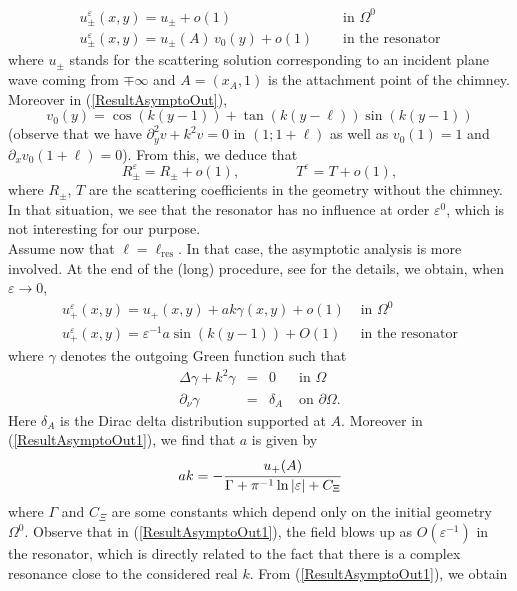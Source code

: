 \documentclass[11pt,a4paper]{report}
\newcommand{\eps}{\varepsilon}
\newcommand{\Om}{\Omega}
\newcommand{\mrm}[1]{\mathrm{#1}}
\begin{document}
\begin{equation}\label{ResultAsymptoOut}
\begin{array}{|ll}
u^\eps_{\pm}(x,y)=u_{\pm}+o(1) &\quad\mbox{ in }\Om^0\\[4pt]
u^{\eps}_{\pm}(x,y)=u_{\pm}(A)\,v_0(y)+o(1) &\quad\mbox{ in the resonator}
\end{array}
\end{equation}
where $u_{\pm}$ stands for the scattering solution corresponding to an incident plane wave coming from $\mp\infty$ and $A=(x_A,1)$ is the attachment point of the chimney. Moreover in (\ref{ResultAsymptoOut}),
\[
v_0(y)=\cos(k(y-1)) + \tan(k(y-\ell))\sin(k(y-1))
\]
(observe that we have $\partial^2_yv+k^2v=0$ in $(1;1+\ell)$ as well as $v_0(1)=1$ and $\partial_xv_0(1+\ell)=0$). From this, we deduce that 
\[
R^\eps_{\pm}=R_{\pm}+o(1),\qquad\qquad T^\eps= T+o(1),
\]
where $R_{\pm}$, $T$ are the scattering coefficients in the geometry without the chimney. In that situation, we see that the resonator has no influence at order $\eps^0$, which is not interesting for our purpose.\\
\newline 
Assume now that $\ell=\ell_{\mrm{res}}$. In that case, the asymptotic analysis is more involved. At the end of the (long) procedure, see \cite{ChHN22} for the details, we obtain, when $\eps\to0$,
\begin{equation}\label{ResultAsymptoOut1}
\begin{array}{|ll}
u^{\eps}_+(x,y)=u_+(x,y)+ak\gamma(x,y)+o(1) &\mbox{ in }\Om^0\\[4pt]
u^{\eps}_+(x,y)=\eps^{-1}a\sin(k (y-1))+O(1) &\mbox{ in the resonator}
\end{array}
\end{equation}
where $\gamma$ denotes the outgoing Green function such that 
\[
\begin{array}{|rcll}
\Delta \gamma+ k^2\gamma  &=&  0&\mbox{ in }\Om \\ [2pt]
\partial_{\nu} \gamma  &=&  \delta_A&\mbox{ on }\partial\Om.
\end{array} 
\]
Here $\delta_A$ is the Dirac delta distribution supported at $A$. Moreover in (\ref{ResultAsymptoOut1}), we find that $a$ is given by
\[
ak=-\cfrac{u_+(A)}{\Gamma+\pi^{-1}\ln|\eps|+C_{\Xi}}
\]
where $\Gamma$ and $C_{\Xi}$ are some constants which depend only on the initial geometry $\Om^0$. Observe that in (\ref{ResultAsymptoOut1}), the field blows up as $O(\eps^{-1})$ in the resonator, which is directly related to the fact that there is a complex resonance close to the considered real $k$. From (\ref{ResultAsymptoOut1}), we obtain 
\end{document}
